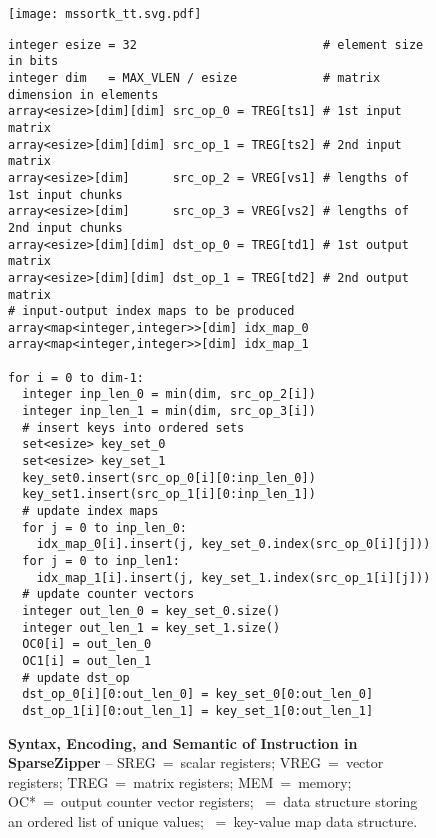 \lstset{style=python-style}

\begin{figure*}[tp]
\centering


\texttt{[image: mssortk\_tt.svg.pdf]}
\begin{lstlisting}[xleftmargin=0.025\tw]
integer esize = 32                          # element size in bits
integer dim   = MAX_VLEN / esize            # matrix dimension in elements
array<esize>[dim][dim] src_op_0 = TREG[ts1] # 1st input matrix
array<esize>[dim][dim] src_op_1 = TREG[ts2] # 2nd input matrix
array<esize>[dim]      src_op_2 = VREG[vs1] # lengths of 1st input chunks
array<esize>[dim]      src_op_3 = VREG[vs2] # lengths of 2nd input chunks
array<esize>[dim][dim] dst_op_0 = TREG[td1] # 1st output matrix
array<esize>[dim][dim] dst_op_1 = TREG[td2] # 2nd output matrix
# input-output index maps to be produced
array<map<integer,integer>>[dim] idx_map_0
array<map<integer,integer>>[dim] idx_map_1

for i = 0 to dim-1:
  integer inp_len_0 = min(dim, src_op_2[i])
  integer inp_len_1 = min(dim, src_op_3[i])
  # insert keys into ordered sets
  set<esize> key_set_0
  set<esize> key_set_1
  key_set0.insert(src_op_0[i][0:inp_len_0])
  key_set1.insert(src_op_1[i][0:inp_len_1])
  # update index maps
  for j = 0 to inp_len_0:
    idx_map_0[i].insert(j, key_set_0.index(src_op_0[i][j]))
  for j = 0 to inp_len1:
    idx_map_1[i].insert(j, key_set_1.index(src_op_1[i][j]))
  # update counter vectors
  integer out_len_0 = key_set_0.size()
  integer out_len_1 = key_set_1.size()
  OC0[i] = out_len_0
  OC1[i] = out_len_1
  # update dst_op
  dst_op_0[i][0:out_len_0] = key_set_0[0:out_len_0]
  dst_op_1[i][0:out_len_1] = key_set_1[0:out_len_1]
\end{lstlisting}

\caption[Stream Key Sorting Instruction in SparseZipper]{
  \textbf{Syntax, Encoding, and Semantic of  Instruction in SparseZipper} --
  SREG~=~scalar registers;
  VREG~=~vector registers;
  TREG~=~matrix registers;
  MEM~=~memory;
  OC*~=~output counter vector registers;
  ~=~data structure storing an ordered list of unique values;
  ~=~key-value map data structure.
}
\label{fig:spz-mssortk-inst}
\end{figure*}
